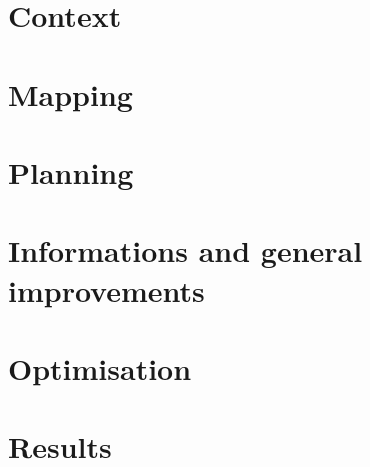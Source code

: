 \documentclass{report}
\begin{document}


\tableofcontents

\chapter{Context}


\chapter{Mapping}


\chapter{Planning}


\chapter{Informations and general improvements}


\chapter{Optimisation}


\chapter{Results}


\listofalgorithms
{}

\nocite{*}


\end{document}
